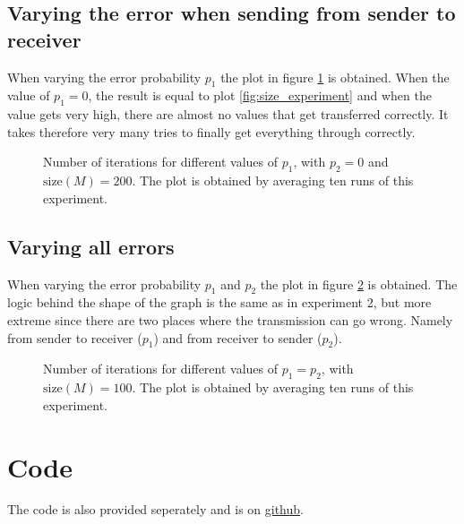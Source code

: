 \documentclass[11pt,fleqn]{article}
\begin{document}
    \subsection{Varying the error when sending from sender to receiver}
    \label{sec:experiment_2}
    When varying the error probability $p_1$ the plot in figure \ref{fig:p1_experiment} is obtained. When the value of $p_1=0$, the result is equal to plot \ref{fig:size_experiment} and when the value gets very high, there are almost no values that get transferred correctly. It takes therefore very many tries to finally get everything through correctly.
    \begin{figure}[H]
        \centering
        
        \caption{Number of iterations for different values of $p_1$, with $p_2=0$ and $\text{size}(M)=200$. The plot is obtained by averaging ten runs of this experiment.}
        \label{fig:p1_experiment}
    \end{figure}

    \subsection{Varying all errors}
    When varying the error probability $p_1$ and $p_2$ the plot in figure \ref{fig:p_experiment} is obtained. The logic behind the shape of the graph is the same as in experiment 2, but more extreme since there are two places where the transmission can go wrong. Namely from sender to receiver ($p_1$) and from receiver to sender ($p_2$).
    \begin{figure}[H]
        \centering
        
        \caption{Number of iterations for different values of $p_1=p_2$, with $\text{size}(M)=100$. The plot is obtained by averaging ten runs of this experiment.}
        \label{fig:p_experiment}
    \end{figure}   
    \section{Code}
    The code is also provided seperately and is on \href{https://github.com/SjdTl/Data-communications-networking.git}{\color{blue}github}.
    \inputminted[breaklines=true]{python3}{Stop-and-wait_protocol.py}
\end{document}
